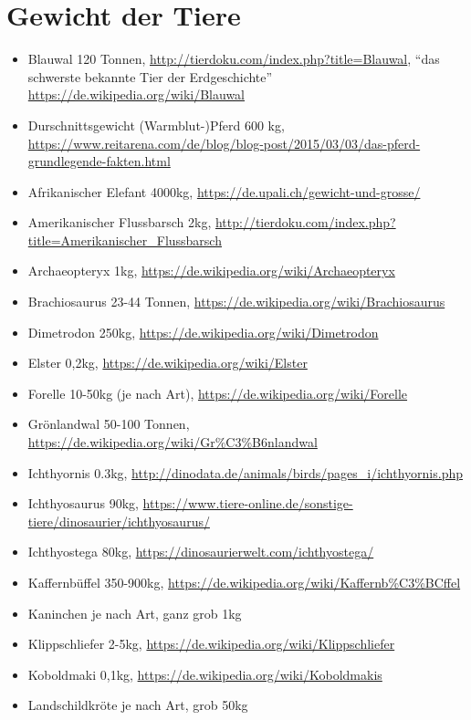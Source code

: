  
 \section{Gewicht der Tiere}
 \label{appendix_pca_weight}
 
 \begin{itemize}
  \item Blauwal 120 Tonnen, \url{http://tierdoku.com/index.php?title=Blauwal}, "`das schwerste bekannte Tier der Erdgeschichte"' \url{https://de.wikipedia.org/wiki/Blauwal}
  \item Durschnittsgewicht (Warmblut-)Pferd 600 kg, \url{https://www.reitarena.com/de/blog/blog-post/2015/03/03/das-pferd-grundlegende-fakten.html}
  \item Afrikanischer Elefant 4000kg, \url{https://de.upali.ch/gewicht-und-grosse/}
  \item Amerikanischer Flussbarsch 2kg, \url{http://tierdoku.com/index.php?title=Amerikanischer_Flussbarsch}
  \item Archaeopteryx 1kg, \url{https://de.wikipedia.org/wiki/Archaeopteryx}
  \item Brachiosaurus 23-44 Tonnen, \url{https://de.wikipedia.org/wiki/Brachiosaurus}
  \item Dimetrodon 250kg, \url{https://de.wikipedia.org/wiki/Dimetrodon}
  \item Elster 0,2kg, \url{https://de.wikipedia.org/wiki/Elster}
  \item Forelle 10-50kg (je nach Art), \url{https://de.wikipedia.org/wiki/Forelle}
  \item Grönlandwal 50-100 Tonnen, \url{https://de.wikipedia.org/wiki/Gr\%C3\%B6nlandwal}
  \item Ichthyornis 0.3kg, \url{http://dinodata.de/animals/birds/pages_i/ichthyornis.php}
  \item Ichthyosaurus 90kg, \url{https://www.tiere-online.de/sonstige-tiere/dinosaurier/ichthyosaurus/}
  \item Ichthyostega 80kg, \url{https://dinosaurierwelt.com/ichthyostega/}
  \item Kaffernbüffel 350-900kg, \url{https://de.wikipedia.org/wiki/Kaffernb\%C3\%BCffel}
  \item Kaninchen je nach Art, ganz grob 1kg
  \item Klippschliefer 2-5kg, \url{https://de.wikipedia.org/wiki/Klippschliefer}
  \item Koboldmaki 0,1kg, \url{https://de.wikipedia.org/wiki/Koboldmakis}
  \item Landschildkröte je nach Art, grob 50kg

\end{itemize}
